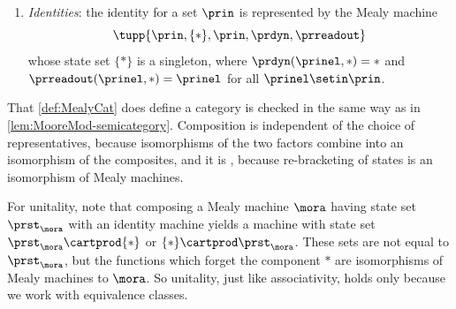 \begin{ctdefinition}
\begin{enumerate}
\begin{equation}
\begin{aligned}
            \prreadout_{\morab}\bigl(\prinel, \tupp{\prsteln{\mora}, \prsteln{\morb}}\bigr) &= \prreadout_{\morb}\bigl(\prreadout_{\mora}(\prinel, \prsteln{\mora}),\, \prsteln{\morb}\bigr).
        \end{aligned}
    \end{equation}
    \item \emph{Identities}: the identity for a set $\prin$ is represented by the Mealy machine
    \begin{equation}
        \tupp{\prin, \{\ast\}, \prin, \prdyn, \prreadout}
    \end{equation}
    whose state set $\{\ast\}$ is a singleton, where $\prdyn(\prinel, \ast) = \ast$ and $\prreadout(\prinel, \ast) = \prinel$ for all $\prinel \setin \prin$.
\end{enumerate}
\end{ctdefinition}

\begin{remark}
    \label{rem:MealyMod-category}
    That \cref{def:MealyCat} does define a category is checked in the same way as in \cref{lem:MooreMod-semicategory}.
    Composition is independent of the choice of representatives, because isomorphisms of the two factors combine into an isomorphism of the composites, and it is , because re-bracketing of states is an isomorphism of Mealy machines.

    For unitality, note that composing a Mealy machine $\mora$ having state set $\prst_{\mora}$ with an identity machine yields a machine with state set $\prst_{\mora} \cartprod \{\ast\}$ or $\{\ast\} \cartprod \prst_{\mora}$.
    These sets are not equal to $\prst_{\mora}$, but the functions which forget the component $\ast$ are isomorphisms of Mealy machines to $\mora$.
    So unitality, just like associativity, holds only because we work with equivalence classes.
\end{remark}
